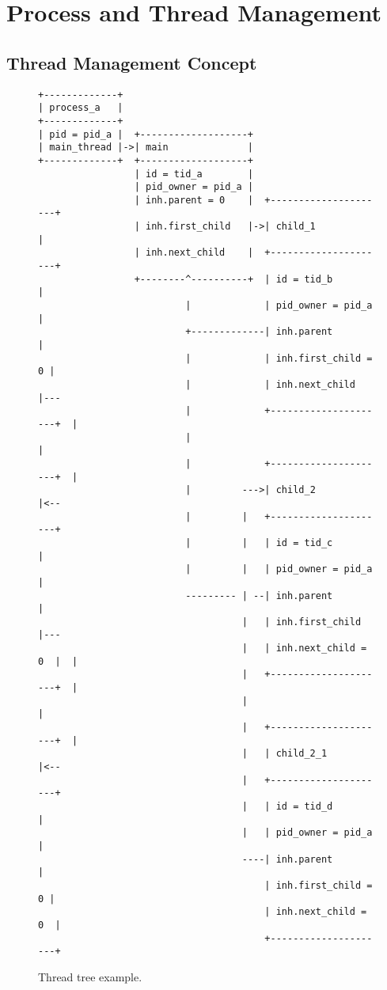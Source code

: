 \part{Process and Thread Management}

\chapter{Thread Management Concept}

\begin{figure}
\begin{verbatim}
+-------------+
| process_a   |
+-------------+
| pid = pid_a |  +-------------------+
| main_thread |->| main              |
+-------------+  +-------------------+
                 | id = tid_a        |
                 | pid_owner = pid_a |
                 | inh.parent = 0    |  +---------------------+
                 | inh.first_child   |->| child_1             |
                 | inh.next_child    |  +---------------------+
                 +--------^----------+  | id = tid_b          |
                          |             | pid_owner = pid_a   |
                          +-------------| inh.parent          |
                          |             | inh.first_child = 0 |
                          |             | inh.next_child      |---
                          |             +---------------------+  |
                          |                                      |
                          |             +---------------------+  |
                          |         --->| child_2             |<--
                          |         |   +---------------------+
                          |         |   | id = tid_c          |
                          |         |   | pid_owner = pid_a   |
                          --------- | --| inh.parent          |
                                    |   | inh.first_child     |---
                                    |   | inh.next_child = 0  |  |
                                    |   +---------------------+  |
                                    |                            |
                                    |   +---------------------+  |
                                    |   | child_2_1           |<--
                                    |   +---------------------+
                                    |   | id = tid_d          |
                                    |   | pid_owner = pid_a   |
                                    ----| inh.parent          |
                                        | inh.first_child = 0 |
                                        | inh.next_child = 0  |
                                        +---------------------+
\end{verbatim}
\caption{Thread tree example.}
\label{figure:thtree}
\end{figure}

